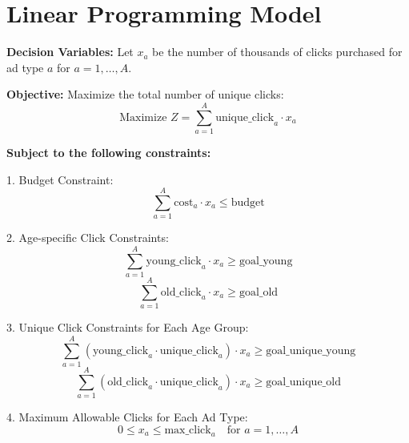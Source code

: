 \documentclass{article}
\begin{document}
\section*{Linear Programming Model}

\textbf{Decision Variables:}
Let \( x_a \) be the number of thousands of clicks purchased for ad type \( a \) for \( a = 1, \ldots, A \).

\textbf{Objective:}
Maximize the total number of unique clicks:
\[
\text{Maximize } Z = \sum_{a=1}^{A} \text{unique\_click}_{a} \cdot x_a
\]

\textbf{Subject to the following constraints:}

1. Budget Constraint:
\[
\sum_{a=1}^{A} \text{cost}_{a} \cdot x_a \leq \text{budget}
\]

2. Age-specific Click Constraints:
\[
\sum_{a=1}^{A} \text{young\_click}_{a} \cdot x_a \geq \text{goal\_young}
\]
\[
\sum_{a=1}^{A} \text{old\_click}_{a} \cdot x_a \geq \text{goal\_old}
\]

3. Unique Click Constraints for Each Age Group:
\[
\sum_{a=1}^{A} \left( \text{young\_click}_{a} \cdot \text{unique\_click}_{a} \right) \cdot x_a \geq \text{goal\_unique\_young}
\]
\[
\sum_{a=1}^{A} \left( \text{old\_click}_{a} \cdot \text{unique\_click}_{a} \right) \cdot x_a \geq \text{goal\_unique\_old}
\]

4. Maximum Allowable Clicks for Each Ad Type:
\[
0 \leq x_a \leq \text{max\_click}_{a} \quad \text{for } a = 1, \ldots, A
\]
\end{document}
